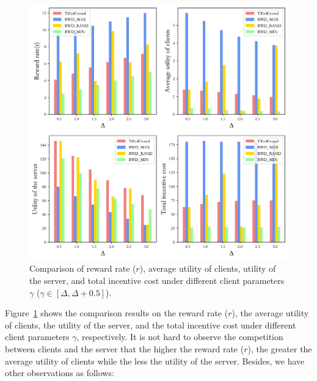 \documentclass[final,1p,times]{elsarticle}
\begin{document}
\begin{figure}
	\centering
	\centerline{\includegraphics[width=5.5in]{fig2.pdf}}
	\caption{Comparison of reward rate ($r$), average utility of clients, utility of the server, and total incentive cost under different client parameters $\gamma$ ($\gamma\in[\Delta,\Delta+0.5]$).}
	\label{fig:2}
\end{figure}

Figure~\ref{fig:2} shows the comparison results on the reward rate ($r$), the average utility of clients, the utility of the server, and the total incentive cost under different client parameters $\gamma$, respectively. It is not hard to observe the competition between clients and the server that the higher the reward rate ($r$), the greater the average utility of clients while the less the utility of the server. Besides, we have other observations as follows:
\end{document}

